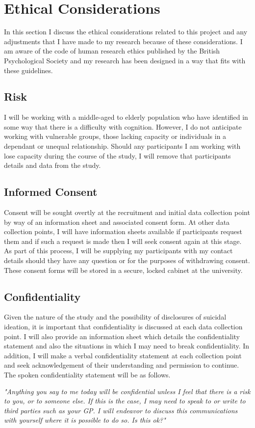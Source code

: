 \documentclass[10pt, letterpaper, twoside, openany]{book}
\begin{document}
\section{Ethical Considerations}
In this section I discuss the ethical considerations related to this project and any adjustments that I have made to my research because of these considerations. I am aware of the code of human  research ethics published by the British Psychological Society \cite{Society2012} and my research has been designed in a way that fits with these guidelines.
\subsection{Risk}
I will be working with a middle-aged to elderly population who have identified in some way that there is a difficulty with cognition. However, I do not anticipate working with vulnerable groups, those lacking capacity or individuals in a dependant or unequal relationship. Should any participants I am working with lose capacity during the course of the study, I will remove that participants details and data from the study.
\subsection{Informed Consent}
Consent will be sought overtly at the recruitment and initial data collection point by way of an information sheet and associated consent form. At other data collection points, I will have information sheets available if participants request them and if such a request is made then I will seek consent again at this stage. As part of this process, I will be supplying my participants with my contact details should they have any question or for the purposes of withdrawing consent. These consent forms will be stored in a secure, locked cabinet at the university. 
\subsection{Confidentiality}
Given the nature of the study and the possibility of disclosures of suicidal ideation, it is important that confidentiality is discussed at each data collection point. I will also provide an information sheet which details the confidentiality statement and also the situations in which I may need to break confidentiality. In addition, I will make a verbal confidentiality statement at each collection point and seek acknowledgement of their understanding and permission to continue. The spoken confidentiality statement will be as follows.
\begin{center}
	\textit{"Anything you say to me today will be confidential unless I feel that there is a risk to you, or to someone else. If this is the case, I may need to speak to or write to third parties such as your GP. I will endeavor to discuss this communications with yourself where it is possible to do so. Is this ok?"}
\end{center}
\end{document}
